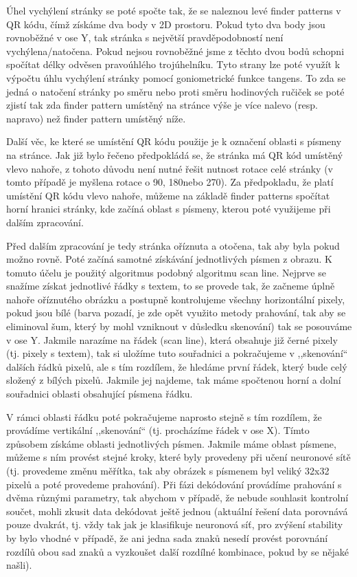\documentclass[conference]{IEEEtran}
\begin{document}
Úhel vychýlení stránky se poté spočte tak, že se naleznou levé finder patterns v QR kódu, čímž získáme dva body v 2D prostoru. Pokud tyto dva body jsou rovnoběžné v ose Y, tak stránka s největší pravděpodobností není vychýlena/natočena. Pokud nejsou rovnoběžné jsme z těchto dvou bodů schopni spočítat délky odvěsen pravoúhlého trojúhelníku. Tyto strany lze poté využít k výpočtu úhlu vychýlení stránky pomocí goniometrické funkce tangens. To zda se jedná o natočení stránky po směru nebo proti směru hodinových ručiček se poté zjistí tak zda finder pattern umístěný na stránce výše je více nalevo (resp. napravo) než finder pattern umístěný níže.

Další věc, ke které se umístění QR kódu použije je k označení oblasti s písmeny na stránce. Jak již bylo řečeno předpokládá se, že stránka má QR kód umístěný vlevo nahoře, z tohoto důvodu není nutné řešit nutnost rotace celé stránky (v tomto případě je myšlena rotace o 90\degree, 180\degree nebo 270\degree). Za předpokladu, že platí umístění QR kódu vlevo nahoře, můžeme na základě finder patterns spočítat horní hranici stránky, kde začíná oblast s písmeny, kterou poté využijeme při dalším zpracování.

Před dalším zpracování je tedy stránka oříznuta a otočena, tak aby byla pokud možno rovně. Poté začíná samotné získávání jednotlivých písmen z obrazu. K tomuto účelu je použitý algoritmus podobný algoritmu scan line. Nejprve se snažíme získat jednotlivé řádky s textem, to se provede tak, že začneme úplně nahoře oříznutého obrázku a postupně kontrolujeme všechny horizontální pixely, pokud jsou bílé (barva pozadí, je zde opět využito metody prahování, tak aby se eliminoval šum, který by mohl vzniknout v důsledku skenování) tak se posouváme v ose Y. Jakmile narazíme na řádek (scan line), která obsahuje již černé pixely (tj. pixely s textem), tak si uložíme tuto souřadnici a pokračujeme v ,,skenování`` dalších řádků pixelů, ale s tím rozdílem, že hledáme první řádek, který bude celý složený z bílých pixelů. Jakmile jej najdeme, tak máme spočtenou horní a dolní souřadnici oblasti obsahující písmena řádku.

V rámci oblasti řádku poté pokračujeme naprosto stejně s tím rozdílem, že provádíme vertikální ,,skenování`` (tj. procházíme řádek v ose X). Tímto způsobem získáme oblasti jednotlivých písmen. Jakmile máme oblast písmene, můžeme s ním provést stejné kroky, které byly provedeny při učení neuronové sítě (tj. provedeme změnu měřítka, tak aby obrázek s písmenem byl veliký 32x32 pixelů a poté provedeme prahování). Při fázi dekódování provádíme prahování s dvěma různými parametry, tak abychom v případě, že nebude souhlasit kontrolní součet, mohli zkusit data dekódovat ještě jednou (aktuální řešení data porovnává pouze dvakrát, tj. vždy tak jak je klasifikuje neuronová síť, pro zvýšení stability by bylo vhodné v případě, že ani jedna sada znaků nesedí provést porovnání rozdílů obou sad znaků a vyzkoušet další rozdílné kombinace, pokud by se nějaké našli). 
\end{document}
